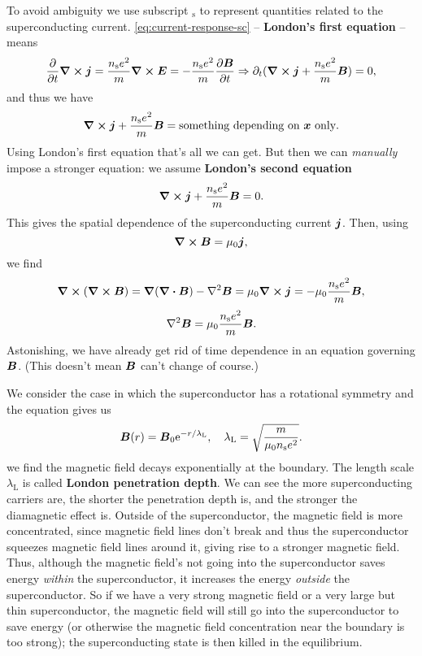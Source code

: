 \documentclass[hyperref, a4paper]{article}
\newcommand*{\ee}{\mathrm{e}}
\newcommand*{\concept}[1]{{\textbf{#1}}}
\begin{document}
To avoid ambiguity we use subscript $_{\text{s}}$ to represent 
quantities related to the superconducting current.
\eqref{eq:current-response-sc} -- \concept{London's first equation} -- means 
\begin{equation}
    \pdv{t} \curl{\vb*{j}} = \frac{n_\text{s} e^2}{m} \curl{\vb*{E}}
    = - \frac{n_\text{s} e^2}{m} \pdv{\vb*{B}}{t}
    \Rightarrow \partial_t(\curl{\vb*{j}} + \frac{n_\text{s} e^2}{m} \vb*{B}) = 0,
\end{equation}
and thus we have 
\begin{equation}
    \curl{\vb*{j}} + \frac{n_\text{s} e^2}{m} \vb*{B} = \text{something depending on $\vb*{x}$ only}.
\end{equation}
Using London's first equation that's all we can get. 
But then we can \emph{manually} impose a stronger equation: 
we assume \concept{London's second equation}
\begin{equation}
    \curl{\vb*{j}} + \frac{n_\text{s} e^2}{m} \vb*{B} = 0.
\end{equation}
This gives the spatial dependence of the superconducting current $\vb*{j}$.
Then, using 
\begin{equation}
    \curl{\vb*{B}} = \mu_0 \vb*{j},
\end{equation}
we find 
\[
    \curl{(\curl{\vb*{B}})} = \grad{(\div{\vb*{B}})} - \laplacian \vb*{B}
    = \mu_0 \curl{\vb*{j}} = - \mu_0 \frac{n_\text{s} e^2}{m} \vb*{B} ,
\]
\begin{equation}
    \laplacian \vb*{B} = \mu_0 \frac{n_\text{s} e^2}{m} \vb*{B}.
\end{equation}
Astonishing, we have already get rid of time dependence 
in an equation governing $\vb*{B}$.
(This doesn't mean $\vb*{B}$ can't change of course.)

We consider the case in which the superconductor has a rotational symmetry 
and the equation gives us 
\begin{equation}
    \vb*{B}(r) = \vb*{B}_0 \ee^{- r / \lambda_{\text{L}}}, \quad 
    \lambda_{\text{L}} = \sqrt{\frac{m}{\mu_0 n_{\text{s}} e^2}}.
\end{equation}
we find the magnetic field decays exponentially at the boundary. 
The length scale $\lambda_{\text{L}}$ is called \concept{London penetration depth}.
We can see the more superconducting carriers are, 
the shorter the penetration depth is, 
and the stronger the diamagnetic effect is.
Outside of the superconductor, 
the magnetic field is more concentrated, 
since magnetic field lines don't break 
and thus the superconductor squeezes magnetic field lines around it,
giving rise to a stronger magnetic field.
Thus, although the magnetic field's not going into the superconductor 
saves energy \emph{within} the superconductor, 
it increases the energy \emph{outside} the superconductor.
So if we have a very strong magnetic field 
or a very large but thin superconductor, 
the magnetic field will still go into the superconductor
to save energy (or otherwise the magnetic field concentration near the boundary is too strong);
the superconducting state is then killed in the equilibrium.
\end{document}
